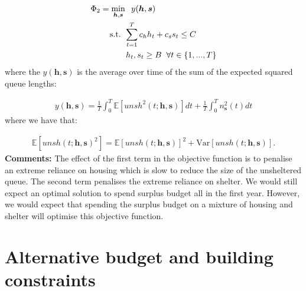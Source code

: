 \documentclass{article}
\begin{document}
\begin{align*}
        & \Phi_2 = \min_{\boldsymbol{h},\boldsymbol{s}} \hspace{0.2cm} y(\boldsymbol{h},\boldsymbol{s}) \\
        & \hspace{0.7cm} \text{ s.t. } \sum_{t=1}^{T} c_{h}h_{t} + c_{s}s_{t} \leq C \\
        & \hspace{1.5cm} h_t, s_t \geq B \hspace{0.2cm} \forall t \in \{1, ..., T\}
\end{align*}
%
where the $y(\boldsymbol{h},\boldsymbol{s})$ is the average over time of the sum of the expected squared queue lengths:

\begin{align*}
  y(\boldsymbol{h},\boldsymbol{s}) = \frac{1}{T} \int_0^T \mathbb{E}[unsh^2(t; \boldsymbol{h},\boldsymbol{s})] dt + \frac{1}{T} \int_0^T n_{\boldsymbol{s}}^2(t) dt
\end{align*}
%
where we have that:
 
\begin{align*}
  \mathbb{E}[unsh(t; \boldsymbol{h},\boldsymbol{s})^2] = \mathbb{E}[unsh(t; \boldsymbol{h},\boldsymbol{s})]^2 + \text{Var}[unsh(t; \boldsymbol{h},\boldsymbol{s})].
\end{align*}
%
\textbf{Comments:} The effect of the first term in the objective function is to penalise an extreme reliance on housing which is slow to reduce the size of the unsheltered queue. The second term penalises the extreme reliance on shelter. We would still expect an optimal solution to spend surplus budget all in the first year. However, we would expect that spending the surplus budget on a mixture of housing and shelter will optimise this objective function. 
%
\newpage

\section{Alternative budget and building constraints}
\end{document}
